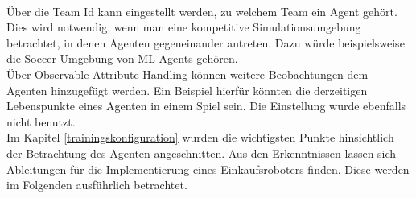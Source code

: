 \\
Über die Team Id kann eingestellt werden, zu welchem Team ein Agent gehört. Dies wird notwendig, wenn man eine kompetitive Simulationsumgebung betrachtet, in denen Agenten gegeneinander antreten. Dazu würde beispielsweise die Soccer Umgebung von ML-Agents gehören.
\\
Über Observable Attribute Handling können weitere Beobachtungen dem Agenten hinzugefügt werden. Ein Beispiel hierfür könnten die derzeitigen Lebenspunkte eines Agenten in einem Spiel sein. Die Einstellung wurde ebenfalls nicht benutzt.
\\
Im Kapitel \ref{trainingskonfiguration} wurden die wichtigsten Punkte hinsichtlich der Betrachtung des Agenten angeschnitten. Aus den Erkenntnissen lassen sich Ableitungen für die Implementierung eines Einkaufsroboters finden. Diese werden im Folgenden ausführlich betrachtet.  

